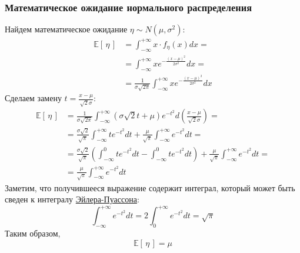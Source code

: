 \documentclass[
  russian,
  a4paper,
  russian]{scrreprt}
\begin{document}
\hypertarget{ux43cux430ux442ux435ux43cux430ux442ux438ux447ux435ux441ux43aux43eux435-ux43eux436ux438ux434ux430ux43dux438ux435-ux43dux43eux440ux43cux430ux43bux44cux43dux43eux433ux43e-ux440ux430ux441ux43fux440ux435ux434ux435ux43bux435ux43dux438ux44f}{%
\subsubsection{Математическое ожидание нормального
распределения}\label{ux43cux430ux442ux435ux43cux430ux442ux438ux447ux435ux441ux43aux43eux435-ux43eux436ux438ux434ux430ux43dux438ux435-ux43dux43eux440ux43cux430ux43bux44cux43dux43eux433ux43e-ux440ux430ux441ux43fux440ux435ux434ux435ux43bux435ux43dux438ux44f}}

Найдем математическое ожидание \(\eta \sim N(\mu, \sigma^2)\):
\[\begin{aligned}
    \mathbb{E}\left[\, \eta \,\right] &= \int_{-\infty}^{+\infty} x \cdot f_\eta(x)dx =\\
                  &= \int_{-\infty}^{+\infty} xe^{-\frac{(x-\mu)^2}{2\sigma^2}}dx =\\
                  &= \frac{1}{\sigma\sqrt{2\pi}} \int_{-\infty}^{+\infty} xe^{-\frac{(x-\mu)^2}{2\sigma^2}}dx
\end{aligned}\] Сделаем замену \(t = \frac{x-\mu}{\sqrt{2}\sigma}\):
\[\begin{aligned}
    \mathbb{E}\left[\, \eta \,\right] &= \frac{1}{\sigma\sqrt{2\pi}} \int_{-\infty}^{+\infty}(\sigma\sqrt{2}t + \mu)
                    e^{-t^2} d\left(\frac{x-\mu}{\sqrt{2}\sigma}\right) =\\
                  &= \frac{\sigma\sqrt{2}}{\sqrt{\pi}}\int_{-\infty}^{+\infty}te^{-t^2}dt
                    + \frac{\mu}{\sqrt{\pi}}\int_{-\infty}^{+\infty}e^{-t^2}dt =\\
                  &= \frac{\sigma\sqrt{2}}{\sqrt{\pi}}\left(\int_{-\infty}^{0}te^{-t^2}dt
                    - \int_{-\infty}^{0}te^{-t^2}dt\right) + \frac{\mu}{\sqrt{\pi}}\int_{-\infty}^{+\infty}e^{-t^2}dt =\\
                  &= \frac{\mu}{\sqrt{\pi}}\int_{-\infty}^{+\infty}e^{-t^2}dt
\end{aligned}\] Заметим, что получившееся выражение содержит интеграл,
который может быть сведен к интегралу
\href{https://ru.wikipedia.org/wiki/Гауссов_интеграл}{Эйлера-Пуассона}:
\[\int_{-\infty}^{+\infty}e^{-t^2}dt = 2\int_{0}^{+\infty}e^{-t^2}dt = \sqrt{\pi}\]
Таким образом, \[\boxed{
    \mathbb{E}\left[\, \eta \,\right] = \mu
}\]
\end{document}
